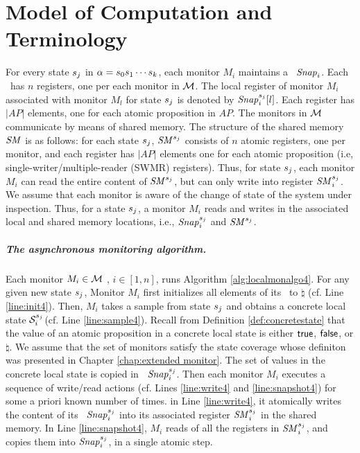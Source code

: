 \section{Model of Computation and Terminology}
\label{sec:model-as}
For every state $s_j$ in $\alpha = s_0 s_1 \cdots s_k$, each monitor $M_i$ maintains a \localreg~$\mathit{Snap}_i$. Each \localreg~has $n$ registers, one per each monitor in $\mathcal{M}$. The local register of monitor $M_i$ associated with monitor $M_l$ for state $s_j$ is denoted by $\mathit{Snap}_i^{s_j}[l]$. Each register has $|AP|$ elements, one for each atomic proposition in $AP$. The monitors in $\mathcal{M}$ communicate by means of shared memory. The structure of the shared memory $\mathit{SM}$ is as follows: for each state $s_j$, $\mathit{SM}^{s_j}$ consists of $n$ atomic registers, one per monitor, and each register has $|AP|$ elements one for each atomic proposition (i.e, single-writer/multiple-reader (SWMR) registers). Thus, for state $s_j$, each monitor $M_i$ can read the entire content of $\mathit{SM}^{s_j}$, but can only write into register $\mathit{SM}_i^{s_j}$. We assume that each monitor is aware of the change of state of the system under inspection. Thus, for a state $s_j$, a monitor $M_i$ reads and writes in the associated local and shared memory locations, i.e., $\mathit{Snap}_i^{s_j}$ and $\mathit{SM}^{s_j}$. \\ 


\subparagraph{The asynchronous monitoring algorithm.}  Each monitor $M_i \in \mathcal{M}$ , $i \in [1, n]$, runs Algorithm \ref{alg:localmonalgo4}. For any given new state $s_j$, Monitor $M_i$ first initializes all elements of its \localreg~to $\natural$ (cf. Line \ref{line:init4}). Then, $M_i$ takes a sample from state $s_j$ and obtains a concrete local state $\mathcal{S}_i^{s_j}$(cf. Line \ref{line:sample4}). Recall from Definition \ref{def:concretestate} that the value of an atomic proposition in a concrete local state is either $\mathsf{true}$, $\mathsf{false}$, or $\natural$. We assume that the set of monitors satisfy the state coverage whose definiton was presented in Chapter \ref{chap:extended monitor}. The set of values in the concrete local state is copied in \localreg~$\mathit{Snap}_i^{s_j}$. Then each monitor $M_i$ executes a sequence of write/read actions (cf. Lines \ref{line:write4} and \ref{line:snapshot4}) for some a priori known number of times. in Line  \ref{line:write4}, it atomically writes the content of its \localreg~$\mathit{Snap}_i^{s_j}$ into its associated register $\mathit{SM}_i^{s_j}$ in the shared memory. In Line \ref{line:snapshot4}, $M_i$ reads of all the registers in $\mathit{SM}_i^{s_j}$, and copies them into $\mathit{Snap}_i^{s_j}$, in a single atomic step.



